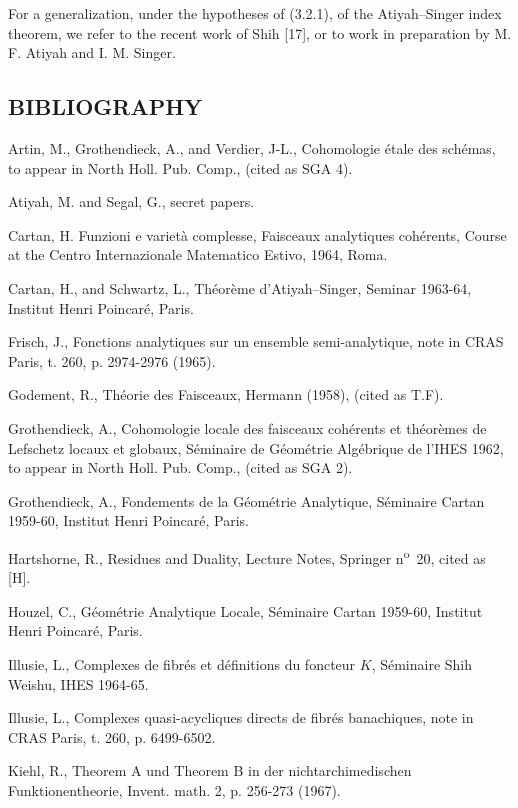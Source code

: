For a generalization, under the hypotheses of (3.2.1), of the Atiyah--Singer index theorem, we refer to the recent work of Shih [17], or to work in preparation by M. F. Atiyah and I. M. Singer.
%
\subsection*{BIBLIOGRAPHY}
\begin{enumerate}[label={[\arabic*]}]
\item
Artin, M., Grothendieck, A., and Verdier, J-L., Cohomologie étale des schémas, to appear in North Holl. Pub. Comp., (cited as SGA 4).
\item Atiyah, M. and Segal, G., secret papers.
\item Cartan, H. Funzioni e varietà complesse, Faisceaux analytiques cohérents, Course at the Centro Internazionale Matematico Estivo, 1964, Roma.
\item Cartan, H., and Schwartz, L., Théorème d'Atiyah--Singer, Seminar 1963-64, Institut Henri Poincaré, Paris.
\item Frisch, J., Fonctions analytiques sur un ensemble semi-analytique, note in CRAS Paris, t. 260, p. 2974-2976 (1965).
\item Godement, R., Théorie des Faisceaux, Hermann (1958), (cited as T.F).
\item Grothendieck, A., Cohomologie locale des faisceaux cohérents et théorèmes de Lefschetz locaux et globaux, Séminaire de Géométrie Algébrique de l'IHES 1962, to appear in North Holl. Pub. Comp., (cited as SGA 2).
\item Grothendieck, A., Fondements de la Géométrie Analytique, Séminaire Cartan 1959-60, Institut Henri Poincaré, Paris.
\item Hartshorne, R., Residues and Duality, Lecture Notes, Springer n\textsuperscript{o}~20, cited as [H].
\item Houzel, C., Géométrie Analytique Locale, Séminaire Cartan 1959-60, Institut Henri Poincaré, Paris.
\item Illusie, L., Complexes de fibrés et définitions du foncteur $K$, Séminaire Shih Weishu, IHES 1964-65.
\item Illusie, L., Complexes quasi-acycliques directs de fibrés banachiques, note in CRAS Paris, t. 260, p. 6499-6502.
\item Kiehl, R., Theorem A und Theorem B in der nichtarchimedischen Funktionentheorie, Invent. math. 2, p. 256-273 (1967).

\end{enumerate}
